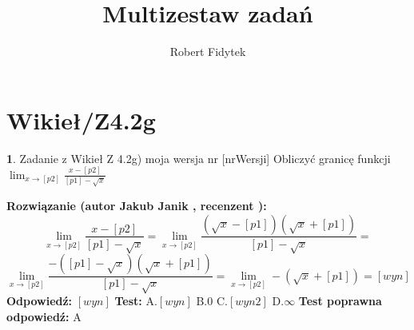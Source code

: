\documentclass[12pt, a4paper]{article}
\title{Multizestaw zadań}
\author{Robert Fidytek}
\date{}
\theoremstyle{definition} %
\newtheorem{zad}{}
\newcommand{\kategoria}[1]{\section{#1}} %
\newcommand{\zadStart}[1]{\begin{zad}#1\newline} %
\newcommand{\zadStop}{\end{zad}}   %
\newcommand{\rozwStart}[2]{\noindent \textbf{Rozwiązanie (autor #1 , recenzent #2): }\newline} %
\newcommand{\rozwStop}{\newline}                                            %
\newcommand{\odpStart}{\noindent \textbf{Odpowiedź:}\newline}    %
\newcommand{\odpStop}{\newline}                                             %
\newcommand{\testStart}{\noindent \textbf{Test:}\newline} %
\newcommand{\testStop}{\newline} %
\newcommand{\kluczStart}{\noindent \textbf{Test poprawna odpowiedź:}\newline} %
\newcommand{\kluczStop}{\newline} %
\begin{document}
\maketitle


\kategoria{Wikieł/Z4.2g}
\zadStart{Zadanie z Wikieł Z 4.2g) moja wersja nr [nrWersji]}
Obliczyć granicę funkcji $\lim_{x \to [p2]} \frac{x-[p2]}{[p1]-\sqrt{x}}$
\zadStop
\rozwStart{Jakub Janik}{}
$$\lim_{x \to [p2]} \frac{x-[p2]}{[p1]-\sqrt{x}}=\lim_{x \to [p2]} \frac{(\sqrt{x}-[p1])(\sqrt{x}+[p1])}{[p1]-\sqrt{x}}=$$
$$\lim_{x \to [p2]} \frac{-([p1]-\sqrt{x})(\sqrt{x}+[p1])}{[p1]-\sqrt{x}}=\lim_{x \to [p2]} -(\sqrt{x}+[p1])=[wyn]$$
\rozwStop
\odpStart
$[wyn]$
\odpStop
\testStart
A.$[wyn]$
B.$0$
C.$[wyn2]$
D.$\infty$
\testStop
\kluczStart
A
\kluczStop
\end{document}
